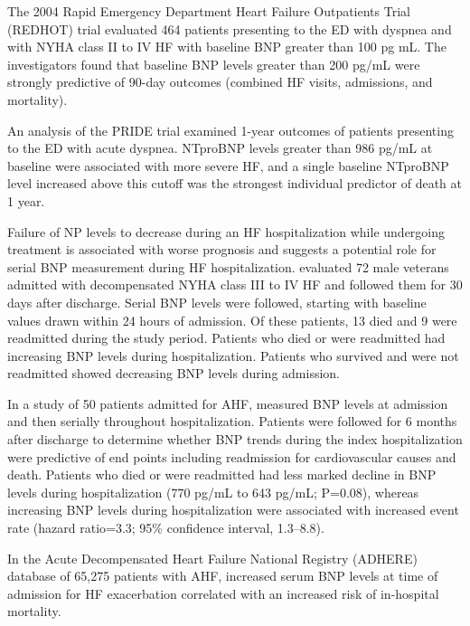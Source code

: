\documentclass[14pt,a4paper,onecolumn]{extarticle}
\begin{document}
The 2004 Rapid Emergency Department Heart Failure Outpatients Trial (REDHOT) trial evaluated 464 patients presenting to the ED with dyspnea and with NYHA class II to IV HF with baseline BNP greater than 100 pg mL. The investigators found that baseline BNP levels greater than 200 pg/mL were strongly predictive of 90-day outcomes (combined HF visits, admissions, and mortality). \citep{Maisel2004} %

An analysis of the PRIDE trial examined 1-year outcomes of patients presenting to the ED with acute dyspnea. NTproBNP levels greater than 986 pg/mL at baseline were associated with more severe HF, and a single baseline NTproBNP level increased above this cutoff was the strongest individual predictor of death at 1 year. \citep{Januzzi2006b} %

Failure of NP levels to decrease during an HF hospitalization while undergoing treatment is associated with worse prognosis and suggests a potential role for serial BNP measurement during HF hospitalization. \citep{Cheng2001} evaluated 72 male veterans admitted with decompensated NYHA class III to IV HF and followed them for 30 days after discharge. Serial BNP levels were followed, starting with baseline values drawn within 24 hours of admission. Of these patients, 13 died and 9 were readmitted during the study period. Patients who died or were readmitted had increasing BNP levels during hospitalization. Patients who survived and were not readmitted showed decreasing BNP levels during admission. \citep{Cheng2001} %

In a study of 50 patients admitted for AHF, \citep{Bettencourt2002} measured BNP levels at admission and then serially throughout hospitalization. Patients were followed for 6 months after discharge to determine whether BNP trends during the index hospitalization were predictive of end points including readmission for cardiovascular causes and death. Patients who died or were readmitted had less marked decline in BNP levels during hospitalization (770  pg/mL to 643  pg/mL; P=0.08), whereas increasing BNP levels during hospitalization were associated with increased event rate (hazard ratio=3.3; 95\% confidence interval, 1.3–8.8). %

In the Acute Decompensated Heart Failure National Registry (ADHERE) database of 65,275 patients with AHF, increased serum BNP levels at time of admission for HF exacerbation correlated with an increased risk of in-hospital mortality. \citep{Fonarow2007} %
\end{document}
